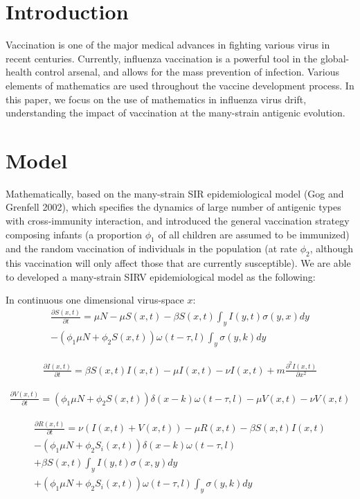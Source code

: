 \documentclass[preprint,12pt]{elsarticle}
\begin{document}
\section{Introduction}
Vaccination is one of the major medical advances in fighting various virus in recent centuries. 
Currently, influenza vaccination is a powerful tool in the global-health control arsenal, and allows for the mass prevention of infection.
Various elements of mathematics are used throughout the vaccine development process.
In this paper, we focus on the use of mathematics in influenza virus drift, understanding the impact of vaccination at the many-strain antigenic evolution. 

\section{Model}
Mathematically, based on the many-strain SIR epidemiological model (Gog and Grenfell 2002), which specifies the dynamics of large number of antigenic types with cross-immunity interaction, and introduced the general vaccination strategy composing infants (a proportion \(\phi_{1}\) of all children are assumed to be immunized) and the random vaccination of individuals in the population (at rate \(\phi_{2}\), although this vaccination will only affect those that are currently susceptible).
We are able to developed a many-strain SIRV epidemiological model as the following:

\newpage
In continuous one dimensional virus-space \(x\):
\begin{align}
  \label{eq:S}
  \frac{\partial S(x,t)}{\partial t} = \mu N - \mu S(x,t) - \beta S(x,t) \int_{y} I(y,t)\sigma(y,x) dy
 \nonumber\\
  -(\phi_{1}\mu N + \phi_{2} S(x,t)) \omega(t-\tau,l) \int_{y} \sigma(y,k) dy
\end{align}

\begin{align}
  \label{eq:I}
  \frac{\partial I(x,t)}{\partial t} = \beta S(x,t) I(x,t) - \mu I(x,t) - \nu I(x,t) + m \frac{\partial^2I(x,t)}{\partial x^2}
\end{align}

\begin{align}
  \label{eq:V}
  \frac{\partial V(x,t)}{\partial t} = (\phi_{1}\mu N + \phi_{2} S(x,t)) \delta(x-k)\omega(t-\tau,l)  - \mu V(x,t) - \nu V(x,t)
\end{align}

\begin{align}
  \label{eq:R}
  \frac{\partial R(x,t)}{\partial t} = \nu (I(x,t) + V(x,t)) - \mu R(x,t) - \beta S(x,t) I(x,t) 
   \nonumber\\
   -(\phi_{1}\mu N + \phi_{2} S_i(x,t)) \delta(x-k)\omega(t-\tau,l)
  \nonumber\\
  +\beta S(x,t)\int_{y} I(y,t)\sigma(x,y) dy
  \nonumber\\
  +(\phi_{1}\mu N + \phi_{2} S_i(x,t)) \omega(t-\tau,l) \int_{y} \sigma(y,k) dy
\end{align}
\end{document}
